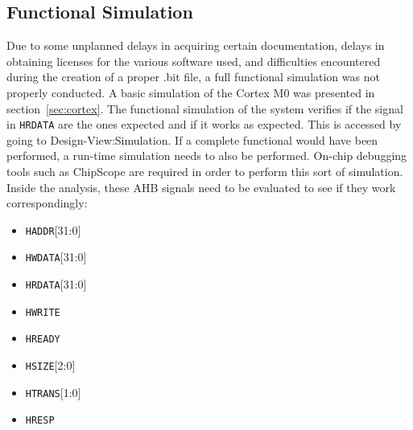 \subsection{Functional Simulation}
Due to some unplanned delays in acquiring certain documentation, delays in obtaining licenses for the various software used, and difficulties encountered during the creation of a proper .bit file, a full functional simulation was not properly conducted. A basic simulation of the Cortex M0 was presented in section~\ref{sec:cortex}.  The functional simulation of the system verifies if the signal in \verb|HRDATA| are the ones expected and if it works as expected. This is accessed by going to Design-View:Simulation. If a complete functional would have been performed, a run-time simulation needs to also be performed. On-chip debugging tools such as ChipScope are required in order to perform this sort of simulation. Inside the analysis, these AHB signals need to be evaluated to see if they work correspondingly: 
\begin{itemize}
\item \verb|HADDR|[31:0] 
\item \verb|HWDATA|[31:0]
\item \verb|HRDATA|[31:0]
\item \verb|HWRITE|
\item \verb|HREADY|
\item \verb|HSIZE|[2:0]
\item \verb|HTRANS|[1:0]
\item \verb|HRESP|
\end{itemize}
